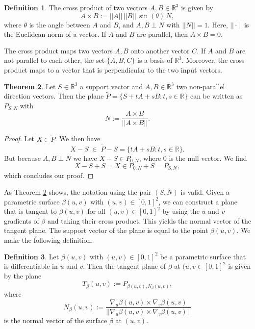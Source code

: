\documentclass[a4paper, 11pt]{report}
\theoremstyle{definition}
\newtheorem{definition}{Definition}[section]
\newtheorem{theorem}[definition]{Theorem}
\begin{document}
	\begin{definition}
		The cross product of two vectors $A, B \in \mathbb{R}^3$ is given by
			$$ A \times B := ||A|| \, ||B|| \, \sin(\theta) \, N,$$
		where $\theta$ is the angle between $A$ and $B$, and $A, B \perp N$ with $||N|| = 1$. Here, $||\cdot||$ is the Euclidean norm of a vector. If $A$ and $B$ are parallel, then $A \times B = 0$.
	\end{definition}

	The cross product maps two vectors $A, B$ onto another vector $C$. If $A$ and $B$ are not parallel to each other, the set $\{A,B,C\}$ is a basis of $\mathbb{R}^3$. Moreover, the cross product maps to a vector that is perpendicular to the two input vectors.

	\begin{theorem}\label{thm:planeequivalence}
		Let $S \in \mathbb{R}^3$ a support vector and $A, B \in \mathbb{R}^3$ two non-parallel direction vectors. Then the plane $\tilde P = \{S + tA + sB : t, s \in \mathbb{R}\}$ can be written as $P_{S,N}$ with 
			$$ N := \frac{A \times B}{||A \times B||}. $$
	\end{theorem}
	\begin{proof}
		Let $X \in \tilde P$. We then have
			$$X - S \; \in \; \tilde P - S = \{tA+sB : t,s \in \mathbb{R}\}.$$
		But because $A, B \perp N$ we have $X-S \in P_{0,N}$, where $0$ is the null vector. We find 
			$$ X-S+S = X \in P_{0,N} + S = P_{S,N},$$
		which concludes our proof.
	\end{proof}

	As Theorem \ref{thm:planeequivalence} shows, the notation using the pair $(S,N)$ is valid. Given a parametric surface $\beta(u,v)$ with $(u,v) \in [0,1]^2$, we can construct a plane that is tangent to $\beta(u, v)$ for all $(u,v) \in [0,1]^2$ by using the $u$ and $v$ gradients of $\beta$ and taking their cross product. This yields the normal vector of the tangent plane. The support vector of the plane is equal to the point $\beta(u,v)$. We make the following definition.

	\begin{definition}\label{def:tangentplanenormal}
		Let $\beta(u,v)$ with $(u,v) \in [0,1]^2$ be a parametric surface that is differentiable in $u$ and $v$. Then the tangent plane of $\beta$ at $(u, v \in [0,1]^2$ is given by the plane
			$$T_{\beta}(u, v) := P_{\beta(u,v), N_{\beta}(u,v)},$$
		where 
			$$N_{\beta}(u,v) := \frac{\nabla_u \beta(u,v) \times \nabla_v \beta(u,v)}{||\nabla_u \beta(u,v) \times \nabla_v \beta(u,v)||}$$
		is the normal vector of the surface $\beta$ at $(u, v)$.
	\end{definition}
\end{document}
